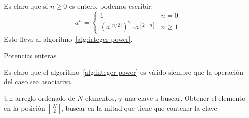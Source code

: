   \begin{example}
    Es claro que si \(n \ge 0\) es entero,
    podemos escribir:
    \begin{equation}
      \label{eq:2}
      a^n
        = \begin{cases}
            1  & n = 0 \\
            \left( a^{\lfloor n / 2 \rfloor} \right)^2 \cdot a^{[2 \nmid n]}
               & n \ge 1
          \end{cases}
    \end{equation}
    Esto lleva al algoritmo~\ref{alg:integer-power}.
    \begin{algorithm}[ht]
      \DontPrintSemicolon\Indp

      \caption{Potencias enteras}
      \label{alg:integer-power}
    \end{algorithm}
    Es claro que el algoritmo~\ref{alg:integer-power}
    es válido siempre que la operación del caso sea asociativa.
  \end{example}
  \begin{example}
    Un arreglo ordenado de \(N\) elementos,
    y una clave a buscar.
    Obtener el elemento
    en la posición \(\left\lfloor \frac{N}{2} \right\rfloor\),
    buscar en la mitad que tiene que contener la clave.
  \end{example}
